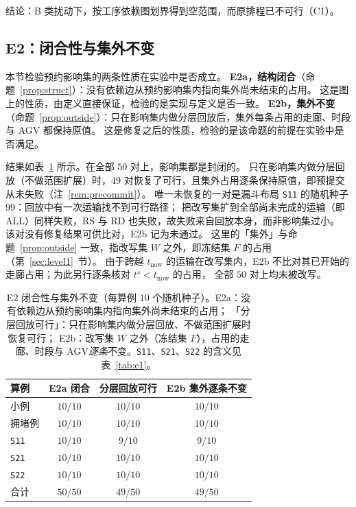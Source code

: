 \documentclass[manuscript,screen,review]{acmart}
\newcommand{\NSeeds}{10}
\newcommand{\NPairs}{50}
\newcommand{\FeasRtwo}{49/\NPairs}           %
\newcommand{\PassClosed}{\NPairs/\NPairs}    %
\newcommand{\PassInvar}{49/\NPairs}          %
\begin{document}
结论：B 类扰动下，按工序依赖图划界得到空范围，而原排程已不可行（C1）。

\subsection{E2：闭合性与集外不变}
\label{sec:e2}

本节检验预约影响集的两条性质在实验中是否成立。
\textbf{E2a，结构闭合}（命题~\ref{prop:struct}）：没有依赖边从预约影响集内指向集外尚未结束的占用。
这是图上的性质，由定义直接保证，检验的是实现与定义是否一致。
\textbf{E2b，集外不变}（命题~\ref{prop:outside}）：只在影响集内做分层回放后，集外每条占用的走廊、时段与 AGV 都保持原值。
这是修复之后的性质，检验的是该命题的前提在实验中是否满足。

结果如表~\ref{tab:e2} 所示。在全部 \(\NPairs\) 对上，影响集都是封闭的。
只在影响集内做分层回放（不做范围扩展）时，\(49\) 对恢复了可行，且集外占用逐条保持原值，即预提交从未失败（注~\ref{rem:precommit}）。
唯一未恢复的一对是漏斗布局 \texttt{S11} 的随机种子 \(99\)：回放中有一次运输找不到可行路径；
把改写集扩到全部尚未完成的运输（即 ALL）同样失败，RS 与 RD 也失败，故失败来自回放本身，而非影响集过小。
该对没有修复结果可供比对，E2b 记为未通过。
这里的「集外」与命题~\ref{prop:outside} 一致，指改写集 \(W\) 之外，即冻结集 \(F\) 的占用（第~\ref{sec:level1}~节）。
由于跨越 \(t_{\mathrm{now}}\) 的运输在改写集内，E2b 不比对其已开始的走廊占用；为此另行逐条核对 \(t^s<t_{\mathrm{now}}\) 的占用，
全部 \(\NPairs\) 对上均未被改写。

\begin{table}[t]
\centering
\caption{E2 闭合性与集外不变（每算例 \(\NSeeds\) 个随机种子）。E2a：没有依赖边从预约影响集内指向集外尚未结束的占用；
「分层回放可行」：只在影响集内做分层回放、不做范围扩展时恢复可行；
E2b：改写集 \(W\) 之外（冻结集 \(F\)），占用的走廊、时段与 AGV\emph{逐条}不变。\texttt{S11}、\texttt{S21}、\texttt{S22} 的含义见表~\ref{tab:e1}。}
\label{tab:e2}
\small
\begin{tabular}{@{}lccc@{}}
\toprule
算例 & E2a 闭合 & 分层回放可行 & E2b 集外逐条不变 \\
\midrule
小例   & \(10/10\) & \(10/10\) & \(10/10\) \\
拥堵例 & \(10/10\) & \(10/10\) & \(10/10\) \\
\texttt{S11}  & \(10/10\) & \(9/10\) & \(9/10\) \\
\texttt{S21}    & \(10/10\) & \(10/10\) & \(10/10\) \\
\texttt{S22}     & \(10/10\) & \(10/10\) & \(10/10\) \\
\midrule
合计 & \(\PassClosed\) & \(\FeasRtwo\) & \(\PassInvar\) \\
\bottomrule
\end{tabular}
\end{table}
\end{document}
